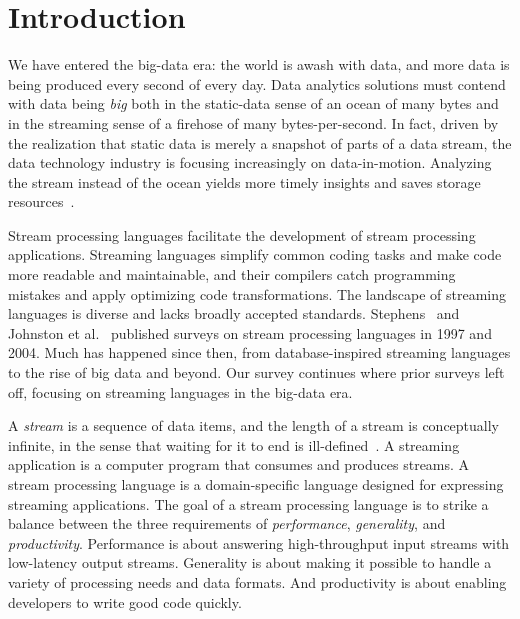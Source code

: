 \section{Introduction}\label{sec:introduction}

We have entered the big-data era: the world is awash with data, and
more data is being produced every second of every day. Data analytics
solutions must contend with data being \emph{big} both in the static-data sense of
an ocean of many bytes and in the streaming sense of a firehose of
many bytes-per-second. In fact, driven by the realization that static
data is merely a snapshot of parts of a data stream, the data technology
industry is focusing increasingly on data-in-motion. Analyzing
the stream instead of the ocean yields more timely insights and saves
storage resources~\cite{andrade2014fundamentals}.

Stream processing languages facilitate the development of stream
processing applications. Streaming languages simplify common coding tasks
and make code more readable and maintainable, and their
compilers catch programming mistakes and apply optimizing code
transformations. The landscape of streaming languages is diverse and
lacks broadly accepted standards.  Stephens~\cite{stephens_1997} and
Johnston et al.~\cite{johnston_hanna_millar_2004} published surveys on
stream processing languages in 1997 and 2004. Much has happened since
then, from database-inspired streaming languages to the rise of big
data and beyond. Our survey continues where prior surveys left off,
focusing on streaming languages in the big-data era.

A \emph{stream} is a sequence of data items, and the length of a
stream is conceptually infinite, in the sense that waiting for it to
end is ill-defined~\cite{muthukrishnan2005data}. A streaming application is a computer program that
consumes and produces streams. A stream processing language is a
domain-specific language designed for expressing streaming
applications. The goal of a stream processing language is to strike a
balance between the three requirements of \emph{performance}, \emph{generality}, and
\emph{productivity}. Performance is about answering high-throughput input
streams with low-latency output streams. Generality is about making it
possible to handle a variety of processing needs and data formats. And
productivity is about enabling developers to write good code
quickly.

